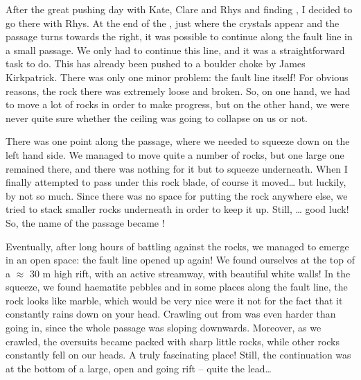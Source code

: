After the great pushing day with Kate, Clare and Rhys and finding
, I decided to go there with Rhys. At the end of the
, just where the crystals appear and the passage
turns towards the right, it was possible to continue along the fault
line in a small passage. We only had to continue this line, and it was a
straightforward task to do. This has already been pushed to a boulder
choke by James Kirkpatrick. There was only one minor problem: the fault
line itself! For obvious reasons, the rock there was extremely loose and
broken. So, on one hand, we had to move a lot of rocks in order to make
progress, but on the other hand, we were never quite sure whether the
ceiling was going to collapse on us or not.

There was one point along the passage, where we needed to squeeze down
on the left hand side. We managed to move quite a number of rocks, but
one large one remained there, and there was nothing for it but to
squeeze underneath. When I finally attempted to pass under this rock
blade, of course it moved\ldots{} but luckily, by not so much. Since
there was no space for putting the rock anywhere else, we tried to stack
smaller rocks underneath in order to keep it up. Still, \ldots{} good luck! So, the name
of the passage became !

Eventually, after long hours of battling against the rocks, we managed
to emerge in an open space: the fault line opened up again! We found
ourselves at the top of a $\approx$ 30 m high rift, with an
active streamway, with beautiful white walls! In the squeeze, we found
haematite pebbles and in some places along the fault line, the rock
looks like marble, which would be very nice were it not for the fact
that it constantly rains down on your head. Crawling out from
 was even harder than going in, since the whole passage
was sloping downwards. Moreover, as we crawled, the oversuits became
packed with sharp little rocks, while other rocks constantly fell on our
heads. A truly fascinating place! Still, the continuation was at the
bottom of a large, open and going rift -- quite the lead\ldots{}





